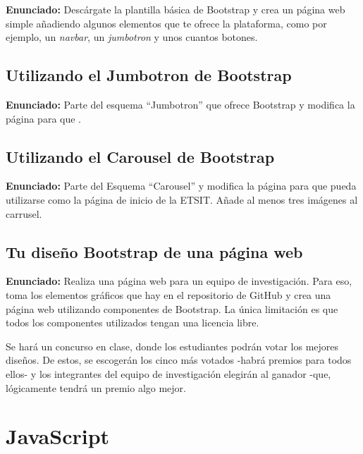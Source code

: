 \textbf{Enunciado:} Descárgate la plantilla básica de Bootstrap y 
crea un página web simple añadiendo algunos elementos que te ofrece la
plataforma, como por ejemplo, un \emph{navbar}, un \emph{jumbotron} y unos
cuantos botones.


\subsection{Utilizando el Jumbotron de Bootstrap}
\label{subsec:jumbotron}

\textbf{Enunciado:} Parte del esquema ``Jumbotron'' que ofrece Bootstrap
y modifica la página para que .

\subsection{Utilizando el Carousel de Bootstrap}
\label{subsec:carousel}

\textbf{Enunciado:} Parte del Esquema ``Carousel'' y modifica la página para que
pueda utilizarse como la página de inicio de la ETSIT. Añade al menos tres 
imágenes al carrusel.


\subsection{Tu diseño Bootstrap de una página web}
\label{subsec:concurso-bootstrap}

\textbf{Enunciado:} Realiza una página web para un equipo de investigación.
Para eso, toma los elementos gráficos que hay en el repositorio de
GitHub y crea una página web utilizando componentes de Bootstrap. La única
limitación es que todos los componentes utilizados tengan una licencia libre.

Se hará un concurso en clase, donde los estudiantes podrán votar los mejores
diseños. De estos, se escogerán los cinco más votados -habrá premios para todos
ellos- y los integrantes del equipo de investigación elegirán al ganador -que,
lógicamente tendrá un premio algo mejor.

\section{JavaScript}

